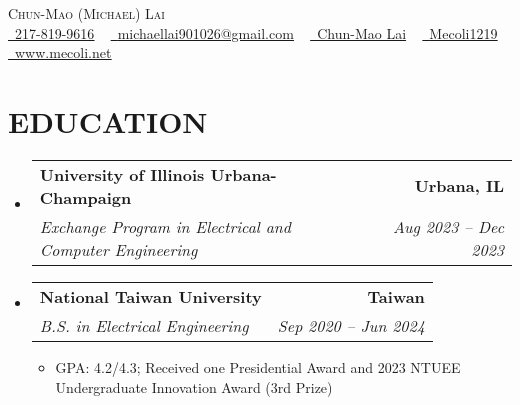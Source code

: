 \documentclass[letterpaper,8pt]{article}
\makeatletter
\newcommand{\resumeItem}[1]{
  \item\small{
    {#1 \vspace{-2pt}}
  }
}
\newcommand{\resumeSubheading}[4]{
    \item
    \begin{tabular*}{1.0\textwidth}[t]{l@{\extracolsep{\fill}}r}
      \textbf{#1} & \textbf{\small #2} \\
      \textit{\small#3} & \textit{\small #4} \\
    \end{tabular*}\vspace{-7pt}
}
\newcommand{\resumeSubHeadingListStart}{\begin{itemize}[leftmargin=0.0in, label={}]}
\newcommand{\resumeSubHeadingListEnd}{\end{itemize}}
\newcommand{\resumeItemListStart}{\begin{itemize}}
\newcommand{\resumeItemListEnd}{\end{itemize}\vspace{-5pt}}
\makeatother
\begin{document}

\begin{center}
    {\huge \scshape Chun-Mao (Michael) Lai} \\ \vspace{3pt}
    \href{tel:217-819-9616}{\raisebox{-0.1\height}\faPhone\ \underline{217-819-9616}} ~ 
    \href{mailto:michaellai901026@gmail.com}{\raisebox{-0.1\height}\faEnvelope\  \underline{michaellai901026@gmail.com}} ~ 
    \href{https://www.linkedin.com/in/chun-mao-lai-aa1966229}{\raisebox{-0.1\height}\faLinkedin\ \underline{Chun-Mao Lai}}  ~
    \href{https://github.com/Mecoli1219}{\raisebox{-0.1\height}\faGithub\ \underline{Mecoli1219}} ~
    \href{https://www.mecoli.net}{\raisebox{-0.1\height}\faHome\ \underline{www.mecoli.net}}\\
    \vspace{-8pt}
\end{center}

\section{EDUCATION}
  \resumeSubHeadingListStart
    \resumeSubheading
      {University of Illinois Urbana-Champaign}{Urbana, IL}
      {Exchange Program in Electrical and Computer Engineering}{\textnormal{Aug 2023 -- Dec 2023}}
    \resumeSubheading
      {National Taiwan University}{Taiwan}
      {B.S. in Electrical Engineering}{\textnormal{Sep 2020 -- Jun 2024}}
      \resumeItemListStart
      \resumeItem{GPA: 4.2/4.3; Received one Presidential Award and 2023 NTUEE Undergraduate Innovation Award (3rd Prize)}
      \resumeItemListEnd
  \resumeSubHeadingListEnd
\vspace{-12pt}
\end{document}
